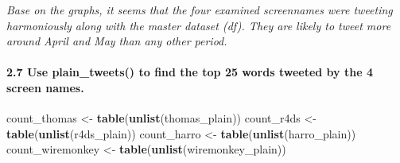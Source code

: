 \documentclass[]{article}
\newenvironment{Shaded}{\begin{snugshade}}{\end{snugshade}}
\newcommand{\CommentTok}[1]{\textcolor[rgb]{0.56,0.35,0.01}{\textit{#1}}}
\newcommand{\KeywordTok}[1]{\textcolor[rgb]{0.13,0.29,0.53}{\textbf{#1}}}
\newcommand{\NormalTok}[1]{#1}
\newcommand{\OperatorTok}[1]{\textcolor[rgb]{0.81,0.36,0.00}{\textbf{#1}}}
\newcommand{\StringTok}[1]{\textcolor[rgb]{0.31,0.60,0.02}{#1}}
\let\oldparagraph\paragraph
\renewcommand{\paragraph}[1]{\oldparagraph{#1}\mbox{}}
\begin{document}
\emph{Base on the graphs, it seems that the four examined screennames
were tweeting harmoniously along with the master dataset (df). They are
likely to tweet more around April and May than any other period. }

\hypertarget{use-plain_tweets-to-find-the-top-25-words-tweeted-by-the-4-screen-names.}{%
\paragraph{2.7 Use plain\_tweets() to find the top 25 words tweeted by
the 4 screen
names.}\label{use-plain_tweets-to-find-the-top-25-words-tweeted-by-the-4-screen-names.}}

\begin{Shaded}
\end{Shaded}

\begin{Shaded}
\begin{Highlighting}[]
\NormalTok{count_thomas <-}\StringTok{ }\KeywordTok{table}\NormalTok{(}\KeywordTok{unlist}\NormalTok{(thomas_plain))}
\NormalTok{count_r4ds <-}\StringTok{ }\KeywordTok{table}\NormalTok{(}\KeywordTok{unlist}\NormalTok{(r4ds_plain)) }
\NormalTok{count_harro <-}\StringTok{ }\KeywordTok{table}\NormalTok{(}\KeywordTok{unlist}\NormalTok{(harro_plain)) }
\NormalTok{count_wiremonkey <-}\StringTok{ }\KeywordTok{table}\NormalTok{(}\KeywordTok{unlist}\NormalTok{(wiremonkey_plain)) }
\end{Highlighting}
\end{Shaded}
\end{document}
